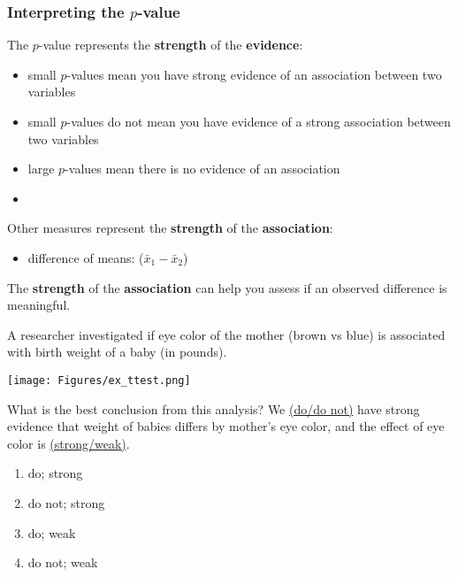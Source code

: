 \begin{frame}
\frametitle{Interpreting the $p$-value}
The $p$-value represents the \textbf{strength} of the \textbf{evidence}:\\
\begin{itemize}
    \item
    small $p$-values mean you have strong evidence of an association between two variables
    \item
    small $p$-values do not mean you have evidence of a strong association between two variables
    \item
    large $p$-values mean there is no evidence of an association
    \item[]
\end{itemize}
Other measures represent the \textbf{strength} of the \textbf{association}:\\
\begin{itemize}
    \item
    difference of means: ($\bar{x}_1-\bar{x}_2$)
\end{itemize}
The \textbf{strength} of the \textbf{association} can help you assess if an observed difference is meaningful.
\end{frame}

\begin{frame}
\small{A researcher investigated if eye color of the mother (brown vs blue) is associated with birth weight of a baby (in pounds).}
\begin{center}
\texttt{[image: Figures/ex\_ttest.png]}
\end{center}
\begin{clicker}{\small{What is the best conclusion from this analysis?  We \underline{(do/do not)} have strong evidence that weight of babies differs by mother's eye color, and the effect of eye color is \underline{(strong/weak)}.}}
\small{
\begin{enumerate}
    \item
    do; strong
    \item
    do not; strong
    \item
    do; weak
    \item
    do not; weak
\end{enumerate}}
\end{clicker}
\end{frame}


